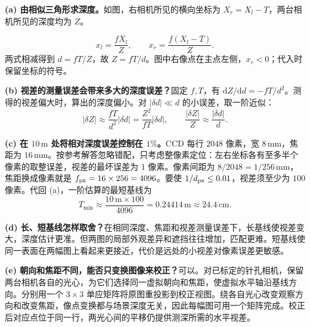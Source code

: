 \begin{checkedsolution}
\textbf{(a) 由相似三角形求深度。}如图，右相机所见的横向坐标为 $X_r=X_l-T$，两台相机所见的深度均为 $Z$。
\par\noindent
\begin{minipage}[c]{0.44\linewidth}
\centering
{}
\end{minipage}\hfill
\begin{minipage}[c]{0.53\linewidth}
\[
 x_l=\frac{fX_l}{Z},\qquad x_r=\frac{f(X_l-T)}{Z}.
\]
两式相减得到 $d=fT/Z$，故 $\boxed{Z=fT/d}$。图中右像点在主点左侧，$x_r<0$；代入时保留坐标的符号。
\end{minipage}
\par

\textbf{(b) 视差的测量误差会带来多大的深度误差？}固定 $f,T$，有 $\mathrm dZ/\mathrm dd=-fT/d^2$。测得的视差偏大时，算出的深度偏小。对 $|\delta d|\ll d$ 的小误差，取一阶近似：
\[
 |\delta Z|\approx\frac{fT}{d^2}|\delta d|
 =\frac{Z^2}{fT}|\delta d|,\qquad
 \frac{|\delta Z|}{Z}\approx\frac{|\delta d|}{d}.
\]

\textbf{(c) 在 $10\,\mathrm m$ 处将相对深度误差控制在 $1\%$。}CCD 每行 $2048$ 像素，宽 $8\,\mathrm{mm}$，焦距为 $16\,\mathrm{mm}$。按参考解答忽略错配，只考虑整像素定位：左右坐标各有至多半个像素的取整误差，视差的最坏误差为 $1$ 像素。像素间距为 $8/2048=1/256\,\mathrm{mm}$，焦距换成像素就是 $f_{\rm px}=16\times256=4096$。要使 $1/d_{\rm px}\le 0.01$，视差须至少为 $100$ 像素。代回 (a)，一阶估算的最短基线为
\[
 T_{\min}\approx\frac{10\,\mathrm m\times100}{4096}
 =0.24414\,\mathrm m\approx\boxed{24.4\,\mathrm{cm}}.
\]

\textbf{(d) 长、短基线怎样取舍？}在相同深度、焦距和视差测量误差下，长基线使视差变大，深度估计更准。但两图的局部外观差异和遮挡往往增加，匹配更难。短基线使同一表面在两幅图上看起来更接近，代价是远处的小视差对像素误差更敏感。

\textbf{(e) 朝向和焦距不同，能否只变换图像来校正？}可以。对已标定的针孔相机，保留两台相机各自的光心，为它们选择同一虚拟朝向和焦距，使虚拟水平轴沿基线方向。分别用一个 $3\times3$ 单应矩阵将原图重投影到校正视图。绕各自光心改变观察方向和改变焦距，像点变换都与场景深度无关，因此每幅图可用一个矩阵完成。校正后对应点位于同一行，两光心间的平移仍提供测深所需的水平视差。
\end{checkedsolution}

